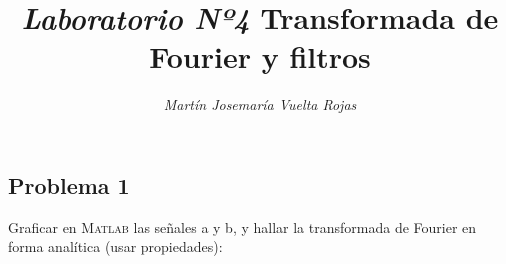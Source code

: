 \documentclass[a4paper,12pt,final]{article}
\begin{document}
  \title{\textit{\Large Laboratorio Nº4}\linebreak{}\linebreak{}
  \textbf{\Huge Transformada de Fourier y filtros}}
  \author{\emph{Martín Josemaría Vuelta Rojas}}
  \maketitle

  \subsection*{Problema 1}
    \noindent Graficar en \textsc{Matlab} las señales a y b, y hallar
      la transformada de Fourier en forma analítica (usar propiedades):

\end{document}
